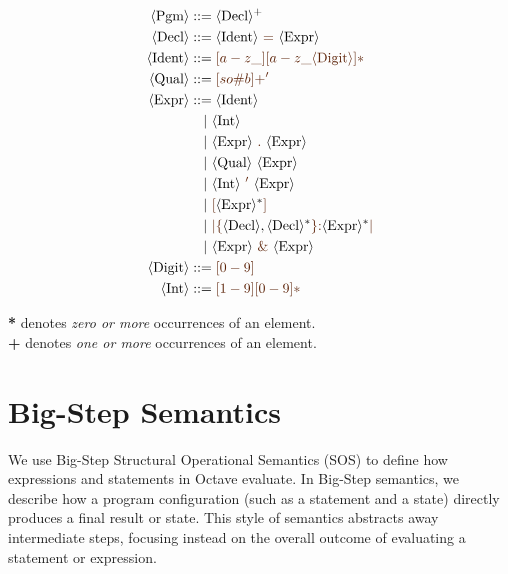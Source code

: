 \documentclass[letterpaper,12pt]{article}
\begin{document}
\begin{align*}
    \langle \text{Pgm} \rangle &::= \langle \text{Decl} \rangle^+ \\
    \langle \text{Decl} \rangle &::= \langle \text{Ident} \rangle \ \textcolor{syntax_color}{=} \ \langle \text{Expr} \rangle \\
    \langle \text{Ident} \rangle &::= \textcolor{syntax_color}{[a-z\_][a-z\_\langle \text{Digit} \rangle]*} \\
    \langle \text{Qual} \rangle &::= \textcolor{syntax_color}{[so\#b]+'} \\
    \langle \text{Expr} \rangle &::= \langle \text{Ident} \rangle \\
    &\quad | \ \langle \text{Int} \rangle \\
    &\quad | \ \langle \text{Expr} \rangle \ \textcolor{syntax_color}{.} \ \langle \text{Expr} \rangle \\
    &\quad | \ \langle \text{Qual} \rangle \ \langle \text{Expr} \rangle \\
    &\quad | \ \langle \text{Int} \rangle \ \textcolor{syntax_color}{'} \ \langle \text{Expr} \rangle \\
    &\quad | \ \textcolor{syntax_color}{[} \langle \text{Expr} \rangle^* \textcolor{syntax_color}{]} \\
    &\quad | \ \textcolor{syntax_color}{|} \textcolor{syntax_color}{\lbrace} \langle \text{Decl} \rangle, \langle \text{Decl} \rangle^* \textcolor{syntax_color}{\rbrace} \textcolor{syntax_color}{:} \langle \text{Expr} \rangle^* \textcolor{syntax_color}{|} \\
    &\quad | \ \langle \text{Expr} \rangle \ \textcolor{syntax_color}{\&} \ \langle \text{Expr} \rangle \\
    \langle \text{Digit} \rangle &::= \textcolor{syntax_color}{[0-9]} \\
    \langle \text{Int} \rangle &::= \textcolor{syntax_color}{[1-9][0-9]*}
\end{align*}

\vspace{2mm}
\noindent\textbf{*} denotes \emph{zero or more} occurrences of an element.\\
\textbf{+} denotes \emph{one or more} occurrences of an element.

\section{Big-Step Semantics}

We use Big-Step Structural Operational Semantics (SOS) to define how expressions 
and statements in Octave evaluate. In Big-Step semantics, we describe how a program configuration (such as a statement and a state) directly produces a final result or state. This style of semantics abstracts away intermediate steps, focusing instead on the overall outcome of evaluating a statement or expression.
\end{document}

